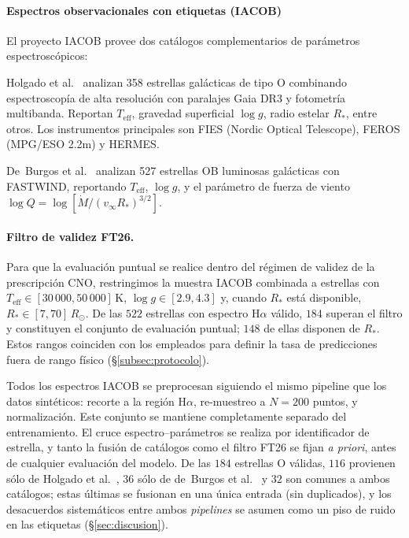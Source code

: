\documentclass[sigconf,ACM]{acmart}
\begin{document}
\paragraph{Espectros observacionales con etiquetas (IACOB)}
El proyecto IACOB provee dos catálogos complementarios de parámetros
espectroscópicos:

Holgado et al.~\cite{Holgado2025} analizan 358 estrellas galácticas de
tipo O combinando espectroscopía de alta resolución con paralajes Gaia DR3 y
fotometría multibanda. Reportan $T_{\mathrm{eff}}$, gravedad superficial $\log g$, radio estelar $R_*$, entre otros. Los instrumentos principales son FIES (Nordic Optical Telescope), FEROS (MPG/ESO 2.2m) y HERMES.

De~Burgos et al.~\cite{deBurgos2024} analizan 527 estrellas OB luminosas
galácticas con FASTWIND, reportando $T_{\mathrm{eff}}$, $\log g$, y el parámetro de fuerza de viento $\log Q = \log[\dot{M}/(v_\infty R_*)^{3/2}]$.

\paragraph{Filtro de validez FT26.}
Para que la evaluación puntual se realice dentro del régimen de validez de la
prescripción CNO, restringimos la muestra IACOB combinada a estrellas con
$T_\mathrm{eff} \in [30\,000, 50\,000]$\,K, $\log g \in [2.9, 4.3]$ y, cuando
$R_*$ está disponible, $R_* \in [7, 70]\,R_\odot$. De las $522$ estrellas con
espectro H$\alpha$ válido, $184$ superan el filtro y constituyen el conjunto de
evaluación puntual; $148$ de ellas disponen de $R_*$. Estos rangos coinciden con
los empleados para definir la tasa de predicciones fuera de rango físico
(§\ref{subsec:protocolo}).

Todos los espectros IACOB se preprocesan siguiendo el mismo pipeline que los
datos sintéticos: recorte a la región H$\alpha$, re-muestreo a $N = 200$
puntos, y normalización. Este conjunto se mantiene completamente separado del entrenamiento. El cruce espectro--parámetros se realiza por identificador de estrella, y tanto la fusión de catálogos como el filtro FT26 se fijan \emph{a priori}, antes de cualquier evaluación del modelo. De las $184$ estrellas O válidas, $116$ provienen sólo de Holgado et al.~\cite{Holgado2025}, $36$ sólo de de~Burgos et al.~\cite{deBurgos2024} y $32$ son comunes a ambos catálogos; estas últimas se fusionan en una única entrada (sin duplicados), y los desacuerdos sistemáticos entre ambos \emph{pipelines} se asumen como un piso de ruido en las etiquetas (§\ref{sec:discusion}).
\end{document}
